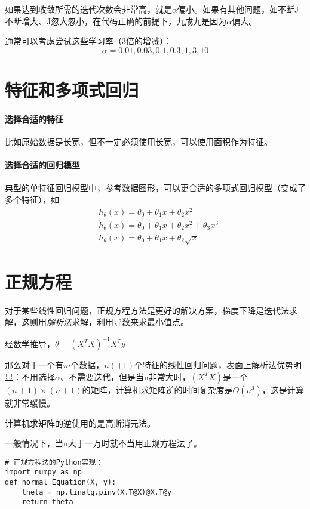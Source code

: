 \documentclass[../main.tex]{subfiles}
\begin{document}
如果达到收敛所需的迭代次数会非常高，就是\(α\)偏小。如果有其他问题，如不断J不断增大、J忽大忽小，在代码正确的前提下，九成九是因为\(α\)偏大。


通常可以考虑尝试这些学习率（3倍的增减）：\[α=0.01, 0.03, 0.1, 0.3, 1, 3, 10\]

\section{特征和多项式回归}
\paragraph{选择合适的特征}比如原始数据是长宽，但不一定必须使用长宽，可以使用面积作为特征。
\paragraph{选择合适的回归模型}典型的单特征回归模型中，参考数据图形，可以更合适的多项式回归模型（变成了多个特征），如
\begin{align*}
     & h_θ(x) = θ_0 + θ_1x + θ_2x^2          \\
     & h_θ(x) = θ_0 + θ_1x + θ_2x^2 + θ_3x^3 \\
     & h_θ(x) = θ_0 + θ_1x + θ_2\sqrt{x}
\end{align*}

\section{正规方程}

对于某些线性回归问题，正规方程方法是更好的解决方案，梯度下降是迭代法求解，这则用\textit{解析法}求解，利用导数来求最小值点。


经数学推导，\(θ=(X^TX)^{-1}X^Ty\)

那么对于一个有\(m\)个数据，\(n(+1)\)个特征的线性回归问题，表面上解析法优势明显：不用选择\(α\)、不需要迭代，但是当n非常大时，\((X^TX)\)是一个\((n+1)×(n+1)\)的矩阵，计算机求矩阵逆的时间复杂度是\(O(n^3)\)，这是计算就非常缓慢。\\
\begin{remark}
    计算机求矩阵的逆使用的是高斯消元法。
\end{remark}
一般情况下，当n大于一万时就不当用正规方程法了。
\begin{verbatim}
# 正规方程法的Python实现：
import numpy as np
def normal_Equation(X, y):
    theta = np.linalg.pinv(X.T@X)@X.T@y
    return theta
\end{verbatim}
\end{document}
